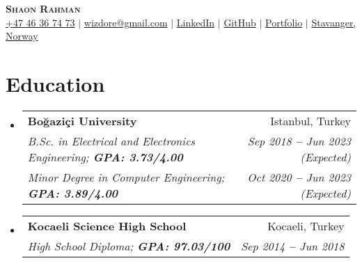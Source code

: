 \documentclass[a4paper,11pt]{article}
\makeatletter
\newcommand{\resumeItem}[1]{
	\item\small{
		{#1 \vspace{-2pt}}
	}
}
\newcommand{\resumeSubheading}[4]{
	\vspace{-2pt}\item
	\begin{tabular*}{0.97\textwidth}[t]{l@{\extracolsep{\fill}}r}
		\textbf{#1} & #2 \\
		\textit{\small#3} & \textit{\small #4} \\
	\end{tabular*}\vspace{-7pt}
}
\newcommand{\resumeEducationHeading}[6]{
	\vspace{-2pt}\item
	\begin{tabular*}{0.97\textwidth}[t]{l@{\extracolsep{\fill}}r}
		\textbf{#1} & #2 \\
		\textit{\small#3} & \textit{\small #4} \\
		\textit{\small#5} & \textit{\small #6} \\
	\end{tabular*}\vspace{-5pt}
}
\newcommand{\resumeSubHeadingListStart}{\begin{itemize}[leftmargin=0.15in, label={}]}
\newcommand{\resumeSubHeadingListEnd}{\end{itemize}}
\newcommand{\resumeItemListStart}{\begin{itemize}}
\newcommand{\resumeItemListEnd}{\end{itemize}\vspace{-5pt}}
\makeatother
\begin{document}
	
	
	\begin{center}
		\textbf{\Huge \scshape Shaon Rahman} \\ \vspace{3pt}
		\small
		\faMobile \hspace{.5pt} \href{tel:+4746367473}{+47 46 36 74 73}
		$|$
		\faAt \hspace{.5pt} \href{mailto:wizdore@gmail.com}{wizdore@gmail.com}
		$|$
		\faLinkedinSquare \hspace{.5pt} \href{https://no.linkedin.com/in/wizdore}{LinkedIn}
		$|$
		\faGithub \hspace{.5pt} \href{https://github.com/Wizdore}{GitHub}
		$|$
		\faGlobe \hspace{.5pt} \href{https://wizdore.github.io/portfolio/}{Portfolio}
		$|$
		\faMapMarker \hspace{.5pt} \href{https://www.google.com/maps/place/Stavanger/@58.9486534,5.6803368,11z/}{Stavanger, Norway}
	\end{center}
	
	
	
	
	\section{Education}
	\vspace{3pt}
	\resumeSubHeadingListStart
	
	\resumeEducationHeading
	{Boğaziçi University
	}{Istanbul, Turkey}
	{B.Sc. in Electrical and Electronics Engineering;   \textbf{GPA: 3.73/4.00}}{Sep 2018 \textbf{--} Jun 2023 (Expected)}
	{Minor Degree in Computer Engineering;   \textbf{GPA: 3.89/4.00}}{Oct 2020 \textbf{--} Jun 2023 (Expected)}
	
	\resumeSubheading
	{Kocaeli Science High School
	}{Kocaeli, Turkey}
	{High School Diploma;   \textbf{GPA: 97.03/100}}{Sep 2014 \textbf{--} Jun 2018}
	
	\resumeSubHeadingListEnd
	
\end{document}
